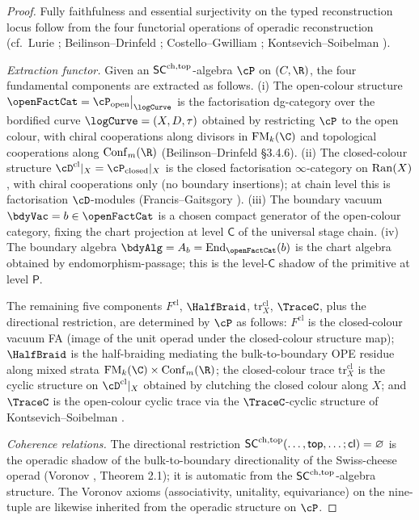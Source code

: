 \begin{proof}
Fully faithfulness and essential surjectivity on the typed
reconstruction locus follow from the four functorial operations of
operadic reconstruction
\textup(cf.\ Lurie \cite[\S 5.5.4]{HA}\textup;
Beilinson--Drinfeld \cite[\S 3.4]{BD04}; Costello--Gwilliam
\cite[Vol.~II Ch.~3]{CG2017}; Kontsevich--Soibelman
\cite{KS09}\textup).

\emph{Extraction functor.}
Given an $\mathsf{SC}^{\mathrm{ch},\mathrm{top}}$-algebra $\cP$ on $(C, \R)$, the four
fundamental components are extracted as follows.
\textup{(i)} The open-colour structure
$\openFactCat = \cP_{\mathrm{open}}\big|_{\logCurve}$ is the
factorisation dg-category over the bordified curve
$\logCurve = (X, D, \tau)$ obtained by restricting
$\cP$ to the open colour, with chiral cooperations along divisors
in $\FM_k(\C)$ and topological cooperations along
$\Conf_m(\R)$ \textup(Beilinson--Drinfeld \cite{BD04} \S 3.4.6\textup).
\textup{(ii)} The closed-colour structure
$\cD^{\mathrm{cl}}|_X = \cP_{\mathrm{closed}}|_X$ is the closed
factorisation $\infty$-category on $\mathrm{Ran}(X)$, with chiral
cooperations only \textup(no boundary insertions\textup); at chain
level this is factorisation $\cD$-modules
\textup(Francis--Gaitsgory \cite{FG12}\textup).
\textup{(iii)} The boundary vacuum
$\bdyVac = b \in \openFactCat$ is a chosen compact generator of
the open-colour category, fixing the chart projection at level
$\mathsf{C}$ of the universal stage chain.
\textup{(iv)} The boundary algebra $\bdyAlg = A_b =
\mathrm{End}_{\openFactCat}(b)$ is the chart algebra obtained by
endomorphism-passage; this is the level-$\mathsf{C}$ shadow of the
primitive at level $\mathsf{P}$.

The remaining five components $F^{\mathrm{cl}}$, $\HalfBraid$,
$\mathrm{tr}^{\mathrm{cl}}_X$, $\TraceC$, plus the directional
restriction, are determined by $\cP$ as follows: $F^{\mathrm{cl}}$
is the closed-colour vacuum FA \textup(image of the unit operad
under the closed-colour structure map\textup); $\HalfBraid$ is the
half-braiding mediating the bulk-to-boundary OPE residue along
mixed strata $\FM_k(\C) \times \Conf_m(\R)$; the closed-colour
trace $\mathrm{tr}^{\mathrm{cl}}_X$ is the cyclic structure on
$\cD^{\mathrm{cl}}|_X$ obtained by clutching the closed colour
along $X$; and $\TraceC$ is the open-colour cyclic trace via the
$\TraceC$-cyclic structure of Kontsevich--Soibelman
\cite{KS09}.

\emph{Coherence relations.}
The directional restriction
$\mathsf{SC}^{\mathrm{ch},\mathrm{top}}(\ldots, \mathsf{top}, \ldots; \mathsf{cl}) = \varnothing$
is the operadic shadow of the bulk-to-boundary directionality of the
Swiss-cheese operad \textup(Voronov \cite{Voronov1998}, Theorem
2.1\textup); it is automatic from the $\mathsf{SC}^{\mathrm{ch},\mathrm{top}}$-algebra structure.
The Voronov axioms (associativity, unitality, equivariance) on the
nine-tuple are likewise inherited from the operadic structure on
$\cP$.


\end{proof}
